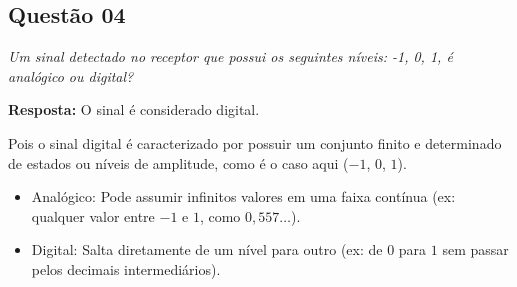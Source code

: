 \subsection*{Questão 04}

\textit{Um sinal detectado no receptor que possui os seguintes níveis: -1, 0, 1, é analógico ou digital?}

\textbf{Resposta:}
O sinal é considerado digital.\par
Pois o sinal digital é caracterizado por possuir um conjunto finito e determinado de estados ou níveis de amplitude, como é o caso aqui ($-1$, $0$, $1$).
\begin{itemize}
    \item Analógico: Pode assumir infinitos valores em uma faixa contínua (ex: qualquer valor entre $-1$ e $1$, como $0,557\dots$).
    \item Digital: Salta diretamente de um nível para outro (ex: de $0$ para $1$ sem passar pelos decimais intermediários).
\end{itemize}


